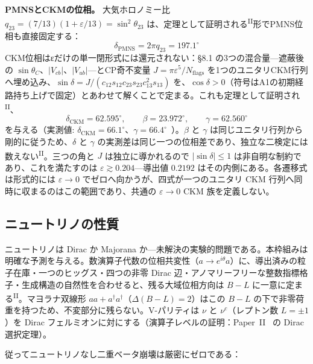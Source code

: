 \documentclass[fontsize=11pt,paper=a4,lualatex]{jlreq}
\newcommand{\PII}{\textsuperscript{\textup{II}}}
\begin{document}
\noindent\textbf{PMNSとCKMの位相。}\;
大気ホロノミー比 $q_{23} = (7/13)(1+\varepsilon/13) = \sin^2\!\theta_{23}$ は、定理として証明される\PII{}形でPMNS位相も直接固定する：
\begin{equation}
\delta_\mathrm{PMNS} = 2\pi q_{23} = 197.1^\circ
\end{equation}
CKM位相はεだけの単一閉形式には還元されない：§8.1 の3つの混合量---遮蔽後の $\sin\theta_C$、$|V_{cb}|$、$|V_{ub}|$---とCP奇不変量 $J = \pi\varepsilon^5/N_\mathrm{flags}$ を1つのユニタリCKM行列へ埋め込み、$\sin\delta = J/(c_{12}s_{12}c_{23}s_{23}c_{13}^2 s_{13})$ を、$\cos\delta > 0$（符号はA1の初期経路持ち上げで固定）とあわせて解くことで定まる。これも定理として証明され\PII{}、
\begin{equation}
\delta_\mathrm{CKM} = 62.595^\circ,\qquad \beta = 23.972^\circ,\qquad \gamma = 62.560^\circ
\end{equation}
を与える（実測値: $\delta_\mathrm{CKM} = 66.1^\circ$、$\gamma = 66.4^\circ$~\cite{pdg}）。$\beta$ と $\gamma$ は同じユニタリ行列から剛的に従うため、$\delta$ と $\gamma$ の実測差は同じ一つの位相差であり、独立な二検定には数えない\PII{}。三つの角と $J$ は独立に導かれるので $|\sin\delta| \le 1$ は非自明な制約であり、これを満たすのは $\varepsilon \gtrsim 0.204$---導出値 $0.2192$ はその内側にある。各遷移式は形式的には $\varepsilon \to 0$ でゼロへ向かうが、四式が一つのユニタリ CKM 行列へ同時に収まるのはこの範囲であり、共通の $\varepsilon \to 0$ CKM 族を定義しない。



\subsection{ニュートリノの性質}

\label{ux30cbux30e5ux30fcux30c8ux30eaux30ceux306f-dirac-ux7c92ux5b50}

ニュートリノは Dirac か Majorana か---未解決の実験的問題である。本枠組みは明確な予測を与える。数演算子代数の位相共変性（$a \to e^{i\theta}a$）に、導出済みの粒子在庫・一つのヒッグス・四つの非零 Dirac 辺・アノマリーフリーな整数指標格子・生成構造の自然性を合わせると、残る大域位相方向は $B-L$ に一意に定まる\PII{}。マヨラナ双線形 $aa + a^\dagger a^\dagger$（$\Delta(B{-}L) = 2$）はこの $B-L$ の下で非零荷重を持つため、不変部分に残らない。V-パリティは $\nu$ と $\nu^c$（レプトン数 $L = \pm 1$）を Dirac フェルミオンに対にする（演算子レベルの証明：Paper~II~\cite{paper2} の Dirac 選択定理）。

従ってニュートリノなし二重ベータ崩壊は厳密にゼロである：
\end{document}

